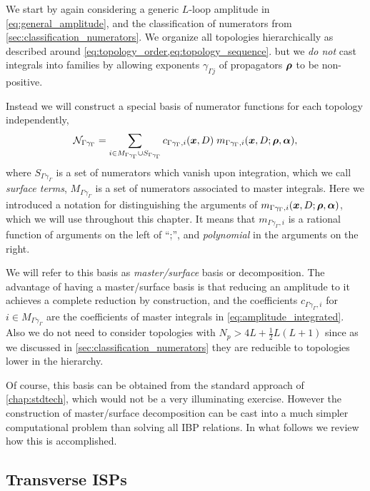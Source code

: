 We start by again considering a generic $L$-loop amplitude in \cref{eq:general_amplitude},
and  the classification of numerators from \cref{sec:classification_numerators}.
We organize all topologies hierarchically as described around \cref{eq:topology_order,eq:topology_sequence}.
but we \emph{do not} cast integrals into families by allowing exponents $\gamma_{\Gamma j}$ of propagators $\vb*{\rho}$ to be non-positive.

Instead we will construct a special basis of numerator functions for each topology independently,
\begin{equation} \label{eq:master_surface_basis}
  \mathcal{N}_{\Gamma \gamma_\Gamma} = \sum_{i \in M_{\Gamma\gamma_\Gamma} \cup S_{\Gamma\gamma_\Gamma}} c_{\Gamma\gamma_\Gamma, i}(\vb*{x},D) \; m_{\Gamma\gamma_\Gamma, i} (\vb*{x},D;\vb*{\rho},\vb*{\alpha}),
\end{equation}
where $S_{\Gamma\gamma_\Gamma}$ is a set of numerators which vanish upon integration, which we call \emph{surface terms}, $M_{\Gamma\gamma_\Gamma}$ is a set of numerators associated to master integrals.
Here we introduced a notation for distinguishing the arguments of $m_{\Gamma\gamma_\Gamma, i} (\vb*{x},D;\vb*{\rho},\vb*{\alpha})$,
which we will use throughout this chapter. 
It means that $m_{\Gamma\gamma_\Gamma, i}$ is a rational function of arguments on the left of ``;'', and \emph{polynomial} in the arguments on the right. 

We will refer to this basis as \emph{master/surface} basis or decomposition.
The advantage of having a master/surface basis is that
reducing an amplitude to it achieves
a complete reduction by construction,
and the coefficients $c_{\Gamma\gamma_\Gamma,i}$ for $i\in M_{\Gamma\gamma_\Gamma}$ are the coefficients
of master integrals in \cref{eq:amplitude_integrated}.
Also we do not need to consider topologies with $N_p > 4L + \frac{1}{2}L(L+1)$ since as we discussed in \cref{sec:classification_numerators}
they are reducible to topologies lower in the hierarchy.

Of course, this basis can be obtained from the standard approach of \cref{chap:stdtech}, which would not be a very illuminating exercise.
However the construction of master/surface decomposition can be cast into a much simpler computational problem than solving all IBP relations.
In what follows we review how this is accomplished.


\subsection{Transverse ISPs}
\label{sec:traceless_completion}

